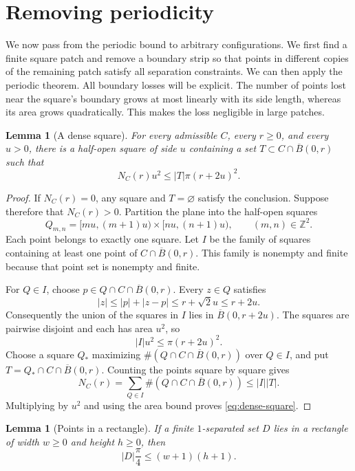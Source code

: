 \documentclass[11pt,a4paper]{article}
\newtheorem{lemma}[theorem]{Lemma}
\theoremstyle{definition}
\theoremstyle{remark}
\newcommand{\Z}{\mathbb{Z}}
\begin{document}
\section{Removing periodicity}
\label{sec:periodization}

We now pass from the periodic bound to arbitrary configurations. We first
find a finite square patch and remove a boundary strip so that points in
different copies of the remaining patch satisfy all separation
constraints. We can then apply the periodic theorem. All boundary losses
will be explicit. The number of points lost near the square's boundary
grows at most linearly with its side length, whereas its area grows
quadratically. This makes the loss negligible in large patches.

\begin{lemma}[A dense square]
\label{lem:dense-square}
For every admissible $C$, every $r\geq0$, and every $u>0$, there is a
half-open square of side $u$ containing a set
$T\subset C\cap\overline B(0,r)$ such that
\begin{equation}
\label{eq:dense-square}
N_C(r)u^2\leq |T|\pi(r+2u)^2.
\end{equation}
\end{lemma}

\begin{proof}
If $N_C(r)=0$, any square and $T=\varnothing$ satisfy the conclusion.
Suppose therefore that $N_C(r)>0$. Partition the plane into the
half-open squares
\[
Q_{m,n}=[mu,(m+1)u)\times[nu,(n+1)u),
\qquad(m,n)\in\Z^2.
\]
Each point belongs to exactly one square. Let $I$ be the family of squares
containing at least one point of $C\cap\overline B(0,r)$. This family
is nonempty and finite because that point set is nonempty and finite.

For $Q\in I$, choose $p\in Q\cap C\cap\overline B(0,r)$. Every $z\in Q$
satisfies
\[
|z|\leq|p|+|z-p|\leq r+\sqrt2u\leq r+2u.
\]
Consequently the union of the squares in $I$ lies in
$\overline B(0,r+2u)$. The squares are pairwise disjoint and each has
area $u^2$, so
\[
|I|u^2\leq\pi(r+2u)^2.
\]
Choose a square $Q_*$ maximizing
$\#(Q\cap C\cap\overline B(0,r))$ over $Q\in I$, and put
$T=Q_*\cap C\cap\overline B(0,r)$. Counting the points square by square
gives
\[
N_C(r)=\sum_{Q\in I}\#(Q\cap C\cap\overline B(0,r))
\leq |I||T|.
\]
Multiplying by $u^2$ and using the area bound proves
\eqref{eq:dense-square}.
\end{proof}

\begin{lemma}[Points in a rectangle]
\label{lem:rectangle}
If a finite $1$-separated set $D$ lies in a rectangle of width $w\geq0$
and height $h\geq0$, then
\begin{equation}
\label{eq:rectangle}
|D|\frac\pi4\leq(w+1)(h+1).
\end{equation}
\end{lemma}
\end{document}
